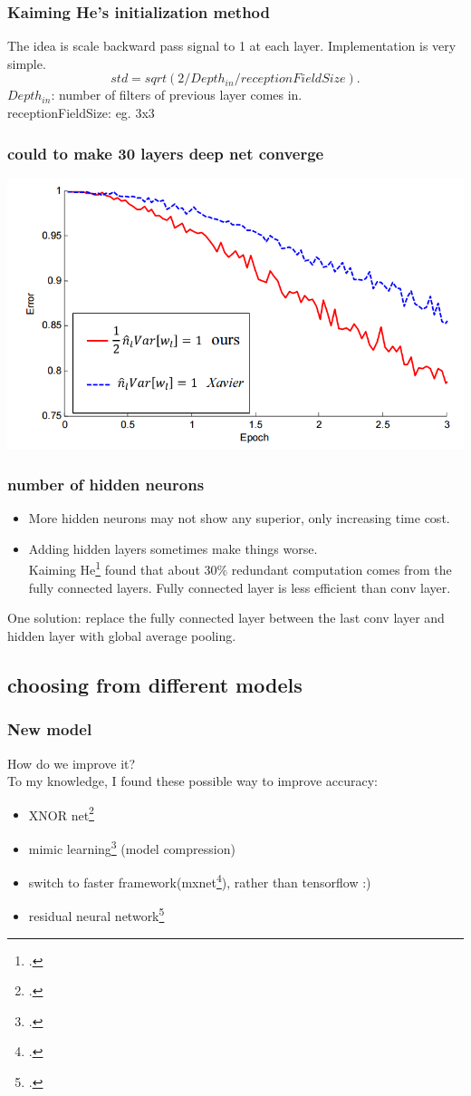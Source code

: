 \documentclass{beamer}
\begin{document}
\begin{frame}
\frametitle{Kaiming He's initialization method}
The idea is scale backward pass signal to 1 at each layer. Implementation is very simple.
\[std=sqrt(2/Depth_{in}/receptionFieldSize).\]
$Depth_{in}$: number of filters of previous layer comes in.\\
receptionFieldSize: eg. 3x3\\
\end{frame}
\begin{frame}
\frametitle{could to make 30 layers deep net converge}
\includegraphics[width=\textwidth]{init.png}
\end{frame}

\begin{frame}
\frametitle{number of hidden neurons}
\begin{itemize}
\item More hidden neurons may not show any superior, only increasing time cost.
\item Adding hidden layers sometimes make things worse.\\
Kaiming He\footcite{he2015deep} found that about 30\% redundant computation comes from the fully connected layers. 
Fully connected layer is less efficient than conv layer.
\end{itemize}
One solution: replace the fully connected layer between the last conv layer and hidden layer with global average pooling.
\end{frame}
\subsection{choosing from different models}
\begin{frame}
\frametitle{New model}
How do we improve it?\\
To my knowledge, I found these possible way to improve accuracy:
\begin{itemize}
\item XNOR net\footcite{rastegari2016xnor}
\item mimic learning\footcite{ba2014deep} (model compression)
\item switch to faster framework(mxnet\footcite{chen2015mxnet}), rather than tensorflow :)
\item residual neural network\footcite{he2015deep}
\end{itemize}
\end{frame}
\end{document}
